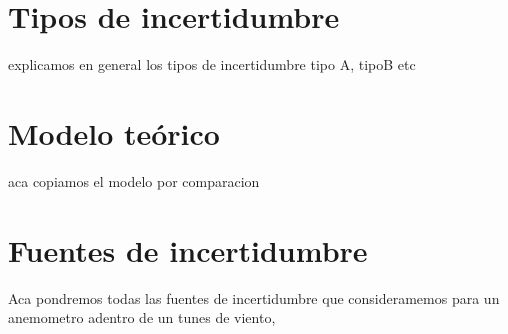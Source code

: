 \section{Tipos de incertidumbre}\label{tipos_incertidumbre}
explicamos en general los tipos de incertidumbre tipo A, tipoB etc
\section{Modelo teórico}\label{modelo_teorico}
aca copiamos el modelo por comparacion
\section{Fuentes de incertidumbre}\label{modelo_teorico}
Aca pondremos todas las fuentes de incertidumbre que consideramemos para un anemometro adentro de un tunes de viento, 